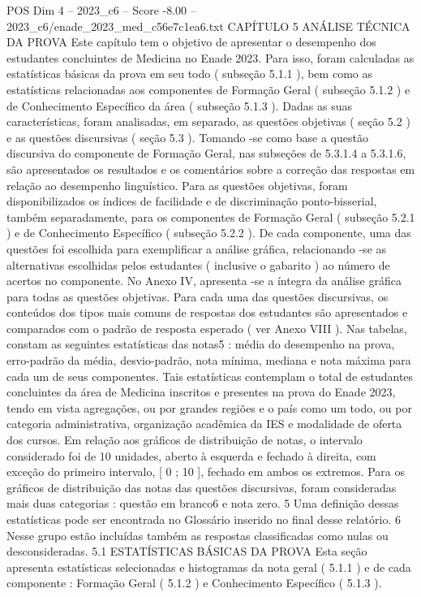 \begin{textsample}{POS Dim 4 – 2023\_c6 – Score -8.00 – 2023\_c6/enade\_2023\_med\_c56e7c1ea6.txt}  \label{ex:f4_pos_347}
CAPÍTULO 5 ANÁLISE TÉCNICA DA PROVA Este capítulo tem o objetivo de apresentar o desempenho dos estudantes concluintes de Medicina no Enade 2023.
Para isso, foram calculadas as estatísticas básicas da prova em seu todo ( subseção 5.1.1 ), bem como as estatísticas relacionadas aos componentes de Formação Geral ( subseção 5.1.2 ) e de Conhecimento Específico da área ( subseção 5.1.3 ).
Dadas as suas características, foram analisadas, em separado, as questões objetivas ( seção 5.2 ) e as questões discursivas ( seção 5.3 ).
Tomando -se como base a questão discursiva do componente de Formação Geral, nas subseções de 5.3.1.4 a 5.3.1.6, são apresentados os resultados e os comentários sobre a correção das respostas em relação ao desempenho linguístico.
Para as questões objetivas, foram disponibilizados os índices de facilidade e de discriminação ponto-bisserial, também separadamente, para os componentes de Formação Geral ( subseção 5.2.1 ) e de Conhecimento Específico ( subseção 5.2.2 ).
De cada componente, uma das questões foi escolhida para exemplificar a análise gráfica, relacionando -se as alternativas escolhidas pelos estudantes ( inclusive o gabarito ) ao número de acertos no componente.
No Anexo IV, apresenta -se a íntegra da análise gráfica para todas as questões objetivas.
Para cada uma das questões discursivas, os conteúdos dos tipos mais comuns de respostas dos estudantes são apresentados e comparados com o padrão de resposta esperado ( ver Anexo VIII ).
Nas tabelas, constam as seguintes estatísticas das notas5 : média do desempenho na prova, erro-padrão da média, desvio-padrão, nota mínima, mediana e nota máxima para cada um de seus componentes.
Tais estatísticas contemplam o total de estudantes concluintes da área de Medicina inscritos e presentes na prova do Enade 2023, tendo em vista agregações, ou por grandes regiões e o país como um todo, ou por categoria administrativa, organização acadêmica da IES e modalidade de oferta dos cursos.
Em relação aos gráficos de distribuição de notas, o intervalo considerado foi de 10 unidades, aberto à esquerda e fechado à direita, com exceção do primeiro intervalo, [ 0 ; 10 ], fechado em ambos os extremos.
Para os gráficos de distribuição das notas das questões discursivas, foram consideradas mais duas categorias : questão em branco6 e nota zero. 5 Uma definição dessas estatísticas pode ser encontrada no Glossário inserido no final desse relatório. 6 Nesse grupo estão incluídas também as respostas classificadas como nulas ou desconsideradas. 5.1 ESTATÍSTICAS BÁSICAS DA PROVA Esta seção apresenta estatísticas selecionadas e histogramas da nota geral ( 5.1.1 ) e de cada componente : Formação Geral ( 5.1.2 ) e Conhecimento Específico ( 5.1.3 ).

\end{textsample}
